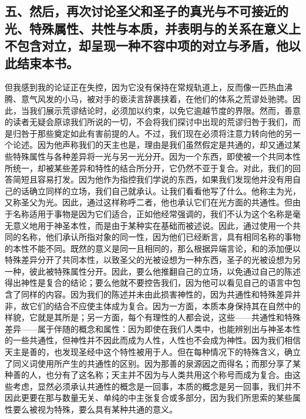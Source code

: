 
\subsection{五、然后，再次讨论圣父和圣子的真光与不可接近的光、特殊属性、共性与本质，并表明与的关系在意义上不包含对立，却呈现一种不容中项的对立与矛盾，他以此结束本书。}

但我感到我的论证正在失控，因为它没有保持在常规轨道上，反而像一匹热血沸腾、意气风发的小马，被对手的亵渎言辞裹挟着，在他们的体系之荒谬处驰骋。因此，当我们展示荒谬结论时，必须加以约束，以免它逾越节度的界限。然而，善意的读者无疑会原谅我们所说的一切，不会将我们探讨中出现的荒谬归咎于我们，而是归咎于那些奠定如此有害前提的人。不过，我们现在必须将注意力转向他的另一个论述。因为他声称我们的天主也是，理由是我们虽然假定是共通的，却又通过某些特殊属性与各种差异将一光与另一光分开。因为一个东西，即使被一个共同本性所统一，却被某些差异和特性的结合所分开，它仍然不亚于复合。对此，我们的回答简短且容易打发。因为他作为指控我们学说的东西，如果我们发现他并没有用自己的话确立同样的立场，我们自己就承认。让我们看看他写了什么。他称主为光，又称圣父为光。因此，通过这样称呼二者，他也承认它们在光方面的共通性。但由于名称适用于事物是因为它们适合，正如他经常强调的，我们不认为这个名称是毫无意义地用于神圣本性，而是由于某种实在基础而被述说。因此，通过使用一个共同的名称，他们承认所指对象的同一性，因为他们已经断言，具有相同名称的事物的本性不能不同。既然的意义是同一且相同的，那么根据异端言论，和的添加便以特殊差异分开了共同本性，以致圣父的光被设想为一种东西，圣子的光被设想为另一种，彼此被特殊属性分开。因此，要么他推翻自己的立场，以免通过自己的陈述得出神性是复合的结论；要么他就不要控告我们，因为他可以看见自己的语言中包含了同样的内容。因为我们的陈述并未由此损害神性的，因为共通性和特殊差异并非，故它们的结合不应使主体成为复合。因为一方面，本质本身保持其在自然中的样貌，它就是其所是；另一方面，每个有理性的人都会说，这些——共通性和特殊差异——属于伴随的概念和属性：因为即使在我们人类中，也能辨别出与神圣本性的一些共通性，但神性并不因此而成为人性，人性也不会成为神性。因为我们相信天主是善的，也发现圣经中这个特性被用于人。但在每种情况下的特殊含义，确立了同义词使用所产生的共通性的区别。因为那善的泉源因之而得名；而那分享了某种善的人，也分有了这名称；天主并不因为与人类共用这个称号而成为复合。由这些考虑，显然必须承认共通性的概念是一回事，本质的概念是另一回事，我们并不因此更要在那与数量无关、单纯的中主张复合或多部分，因为我们所思索的某些属性要么被视为特殊，要么具有某种共通的意义。\par


